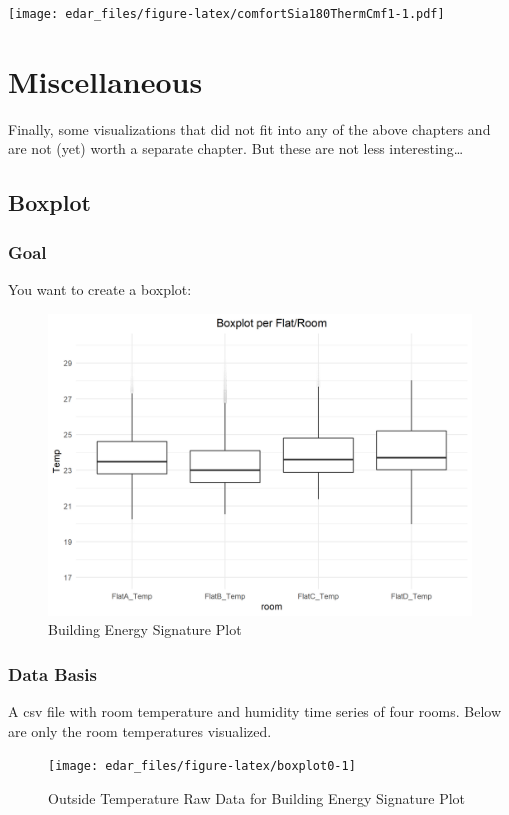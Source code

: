 \documentclass[
  a4paperpaper,
]{book}
\begin{document}
\texttt{[image: edar\_files/figure-latex/comfortSia180ThermCmf1-1.pdf]}

\hypertarget{miscellaneous}{%
\chapter{Miscellaneous}\label{miscellaneous}}

Finally, some visualizations that did not fit into any of the above chapters and are not (yet) worth a separate chapter. But these are not less interesting\ldots{}

\newpage

\hypertarget{boxplot}{%
\section{Boxplot}\label{boxplot}}

\hypertarget{goal-14}{%
\subsection{Goal}\label{goal-14}}

You want to create a boxplot:

\begin{figure}
\includegraphics[width=0.7\linewidth]{images/boxplot} \caption{Building Energy Signature Plot}\label{fig:unnamed-chunk-23}
\end{figure}

\hypertarget{data-basis-14}{%
\subsection{Data Basis}\label{data-basis-14}}

A csv file with room temperature and humidity time series of four rooms. Below are only the room temperatures visualized.

\begin{figure}
\texttt{[image: edar\_files/figure-latex/boxplot0-1]} \caption{Outside Temperature Raw Data for Building Energy Signature Plot}\label{fig:boxplot0}
\end{figure}
\end{document}
